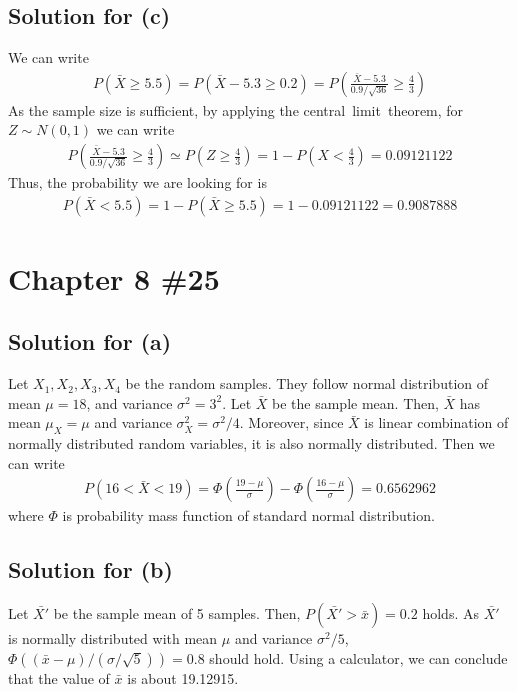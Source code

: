 \documentclass{scrartcl}
\begin{document}
\subsection{Solution for (c)}
We can write
\begin{align*}
  P(\bar{X} \ge 5.5)
  = P(\bar{X} - 5.3 \ge 0.2)
  = P \left( \frac{\bar{X} - 5.3}{0.9 / \sqrt{36}} \ge \frac{4}{3} \right)
\end{align*}
As the sample size is sufficient, by applying the central~limit~theorem, for
\(Z \sim N(0, 1)\) we can write
\begin{align*}
  P \left( \frac{\bar{X} - 5.3}{0.9 / \sqrt{36}} \ge \frac{4}{3} \right)
  \simeq P \left(Z \ge \frac{4}{3} \right)
  = 1 - P \left( X < \frac{4}{3} \right)
  = 0.09121122
\end{align*}
Thus, the probability we are looking for is
\begin{align*}
  P(\bar{X} < 5.5)
  = 1 - P(\bar{X} \ge 5.5)
  = 1 - 0.09121122
  = 0.9087888
\end{align*}

\section{Chapter 8 \#25}
\subsection{Solution for (a)}
Let \(X_1, X_2, X_3, X_4\) be the random samples. They follow normal
distribution of mean \(\mu = 18\), and variance \(\sigma^2 = 3^2\). Let
\(\bar{X}\) be the sample mean. Then, \(\bar{X}\) has mean \(\mu_X = \mu\) and
variance \(\sigma^2_X = \sigma^2 / 4\). Moreover, since \(\bar{X}\) is linear
combination of normally distributed random variables, it is also normally
distributed. Then we can write
\begin{align*}
  P(16 < \bar{X} < 19)
  = \Phi \left( \frac{19 - \mu}{\sigma} \right)
    - \Phi \left( \frac{16 - \mu}{\sigma} \right)
  = 0.6562962
\end{align*}
where \(\Phi\) is probability mass function of standard normal distribution.

\subsection{Solution for (b)}
Let \(\bar{X'}\) be the sample mean of 5 samples. Then, \(P(\bar{X'} > \bar{x})
= 0.2\) holds. As \(\bar{X'}\) is normally distributed with mean \(\mu\) and
variance \(\sigma^2 / 5\), \(\Phi((\bar{x} - \mu) / (\sigma / \sqrt{5})) =
0.8\) should hold. Using a calculator, we can conclude that the value of
\(\bar{x}\) is about 19.12915.
\end{document}
